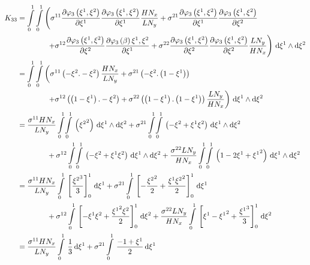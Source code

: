 \begin{equation}
  \begin{aligned}
    K_{33}&=\dintl{0}{1}\dintl{0}{1}\left(
    \conductivitytensorsymbol^{11}\delby{\lbfn{3}{\xione,\xitwo}}{\xione}
    \delby{\lbfn{3}{\xione,\xitwo}}{\xione}\dfrac{H N_{x}}{L N_{y}}+
    \conductivitytensorsymbol^{21}\delby{\lbfn{3}{\xione,\xitwo}}{\xione}
    \delby{\lbfn{3}{\xione,\xitwo}}{\xitwo}\right.\\
    &\qquad\qquad\left.+\conductivitytensorsymbol^{12}\delby{\lbfn{3}{\xione,\xitwo}}{\xitwo}
    \delby{\lbfn{3}{\beta}{\xione,\xitwo}}{\xione}+
    \conductivitytensorsymbol^{22}\delby{\lbfn{3}{\xione,\xitwo}}{\xitwo}
    \delby{\lbfn{3}{\xione,\xitwo}}{\xitwo}\dfrac{L N_{y}}{H N_{x}}\right)\infinitesimaltwo{\xione}{\xitwo}\\
    &=\dintl{0}{1}\dintl{0}{1}\left(
    \conductivitytensorsymbol^{11}\pbrac{-\xitwo.-\xitwo}\dfrac{H N_{x}}{L N_{y}}+
    \conductivitytensorsymbol^{21}\pbrac{-\xitwo.\pbrac{1-\xione}}\right.\\
    &\qquad\qquad\left.+\conductivitytensorsymbol^{12}\pbrac{\pbrac{1-\xione}.-\xitwo}+
    \conductivitytensorsymbol^{22}\pbrac{\pbrac{1-\xione}.\pbrac{1-\xione}}\dfrac{L N_{y}}{H N_{x}}\right)
    \infinitesimaltwo{\xione}{\xitwo}\\
    &=\dfrac{\conductivitytensorsymbol^{11} H N_{x}}{L N_{y}}\giint{0}{1}{0}{1}{\pbrac{\xitwosq}}{\xione}{\xitwo}
    +\conductivitytensorsymbol^{21}\giint{0}{1}{0}{1}{\pbrac{-\xitwo+\xione\xitwo}}{\xione}{\xitwo}\\
    &\qquad\qquad+\conductivitytensorsymbol^{12}\giint{0}{1}{0}{1}{\pbrac{-\xitwo+\xione\xitwo}}{\xione}{\xitwo}
    +\dfrac{\conductivitytensorsymbol^{22} L N_{y}}{H N_{x}}\giint{0}{1}{0}{1}{\pbrac{1-2\xione+\xionesq}}{\xione}{\xitwo} \\
    &=\dfrac{\conductivitytensorsymbol^{11} H N_{x}}{L N_{y}}\gint{0}{1}{\sqbrac{\dfrac{\xitwocube}{3}}^{1}_{0}}{\xione}
    +\conductivitytensorsymbol^{21}\gint{0}{1}{\sqbrac{-\dfrac{\xitwosq}{2}+\dfrac{\xione\xitwosq}{2}}^{1}_{0}}{\xione}\\
    &\qquad\qquad+\conductivitytensorsymbol^{12}\gint{0}{1}{\sqbrac{-\xione\xitwo+\dfrac{\xionesq\xitwo}{2}}^{1}_{0}}{\xitwo}
    +\dfrac{\conductivitytensorsymbol^{22} L N_{y}}{H N_{x}}\gint{0}{1}{\sqbrac{\xione-\xionesq+\dfrac{\xionecube}{3}}^{1}_{0}}{\xitwo} \\
    &=\dfrac{\conductivitytensorsymbol^{11} H N_{x}}{L N_{y}}\gint{0}{1}{\dfrac{1}{3}}{\xione}
    +\conductivitytensorsymbol^{21}\gint{0}{1}{\dfrac{-1+\xione}{2}}{\xione}

\end{aligned}
\end{equation}
